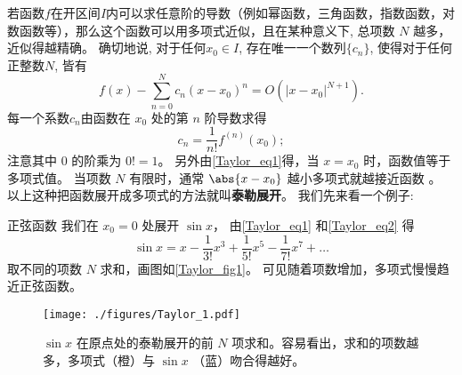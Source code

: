 

若函数$f$在开区间$I$内可以求任意阶的导数（例如幂函数，三角函数，指数函数，对数函数等），那么这个函数可以用多项式近似，且在某种意义下, 总项数 $N$ 越多，近似得越精确。 确切地说, 对于任何$x_0\in I$, 存在唯一一个数列$\{c_n\}$, 使得对于任何正整数$N$, 皆有
\begin{equation}\label{Taylor_eq1}
f(x) -\sum_{n = 0}^N  c_n (x - x_0)^n=O(|x-x_0|^{N+1}).
\end{equation}
每一个系数$c_n$由函数在 $x_0$ 处的第 $n$ 阶导数求得
\begin{equation}\label{Taylor_eq2}
c_n = \frac{1}{n!} f^{(n)}(x_0);
\end{equation}
注意其中 0 的阶乘为 $0! = 1$。 另外由\autoref{Taylor_eq1}得，当 $x=x_0$ 时，函数值等于多项式值。 当项数 $N$ 有限时，通常 $\abs{x-x_0}$ 越小多项式就越接近函数 。 以上这种把函数展开成多项式的方法就叫\textbf{泰勒展开}。 我们先来看一个例子:

\begin{example}{正弦函数}
我们在 $x_0=0$ 处展开 $\sin x$， 由\autoref{Taylor_eq1} 和\autoref{Taylor_eq2} 得
\begin{equation}\label{Taylor_eq3}
\sin x = x - \frac{1}{3!}{x^3} + \frac{1}{5!}{x^5} - \frac{1}{7!} x^7 + \ldots 
\end{equation}
取不同的项数 $N$ 求和，画图如\autoref{Taylor_fig1}。 可见随着项数增加，多项式慢慢趋近正弦函数。

\begin{figure}[ht]
\centering
\texttt{[image: ./figures/Taylor\_1.pdf]}
\caption{$\sin x$ 在原点处的泰勒展开的前 $N$ 项求和。容易看出，求和的项数越多，多项式（橙）与 $\sin x$ （蓝）吻合得越好。}\label{Taylor_fig1}
\end{figure}
\end{example}

